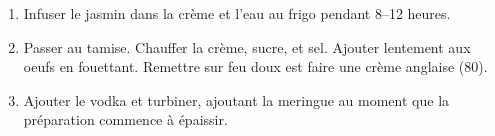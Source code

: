 

\begin{ingredients}
\end{ingredients}


\begin{recipe}
  \begin{enumerate}

  \item Infuser le jasmin dans la crème et l'eau au frigo pendant
    8--12 heures.

  \item Passer au tamise.  Chauffer la crème, sucre, et sel.  Ajouter
    lentement aux oeufs en fouettant.  Remettre sur feu doux est faire
    une crème anglaise (80\degreeC).

  \item Ajouter le vodka et turbiner, ajoutant la meringue au moment
    que la préparation commence à épaissir.

  \end{enumerate}
\end{recipe}

